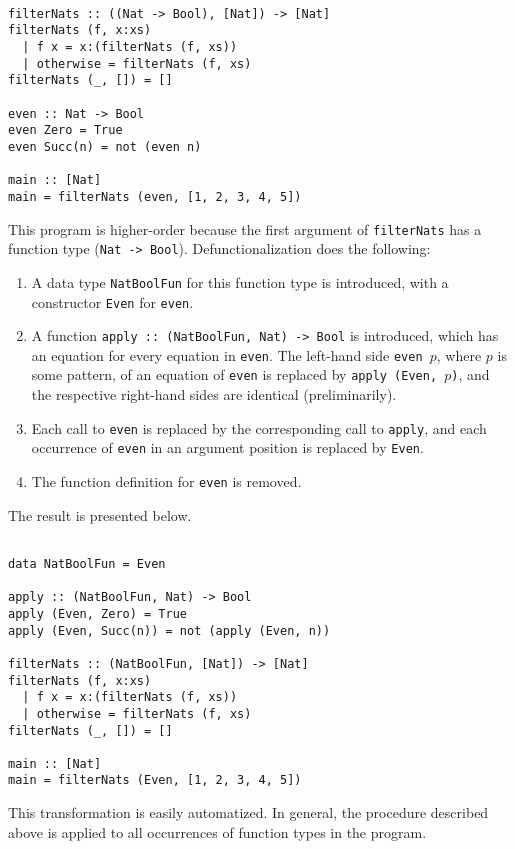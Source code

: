 \begin{lstlisting}

filterNats :: ((Nat -> Bool), [Nat]) -> [Nat]
filterNats (f, x:xs)
  | f x = x:(filterNats (f, xs))
  | otherwise = filterNats (f, xs)
filterNats (_, []) = []

even :: Nat -> Bool
even Zero = True
even Succ(n) = not (even n)

main :: [Nat]
main = filterNats (even, [1, 2, 3, 4, 5])

\end{lstlisting}

This program is higher-order because the first argument of \texttt{filterNats} has a function type (\texttt{Nat -> Bool}). Defunctionalization does the following:
\begin{enumerate}
\item  A data type \texttt{NatBoolFun} for this function type is introduced, with a constructor \texttt{Even} for \texttt{even}.
\item A function \texttt{apply :: (NatBoolFun, Nat) -> Bool} is introduced, which has an equation for every equation in \texttt{even}. The left-hand side \texttt{even $p$}, where $p$ is some pattern, of an equation of \texttt{even} is replaced by \texttt{apply (Even, $p$)}, and the respective right-hand sides are identical (preliminarily).
\item Each call to \texttt{even} is replaced by the corresponding call to \texttt{apply}, and each occurrence of \texttt{even} in an argument position is replaced by \texttt{Even}.
\item The function definition for \texttt{even} is removed.
\end{enumerate}
The result is presented below.

\begin{lstlisting}

data NatBoolFun = Even

apply :: (NatBoolFun, Nat) -> Bool
apply (Even, Zero) = True
apply (Even, Succ(n)) = not (apply (Even, n))

filterNats :: (NatBoolFun, [Nat]) -> [Nat]
filterNats (f, x:xs)
  | f x = x:(filterNats (f, xs))
  | otherwise = filterNats (f, xs)
filterNats (_, []) = []

main :: [Nat]
main = filterNats (Even, [1, 2, 3, 4, 5])

\end{lstlisting}

This transformation is easily automatized. In general, the procedure described above is applied to all occurrences of function types in the program.


